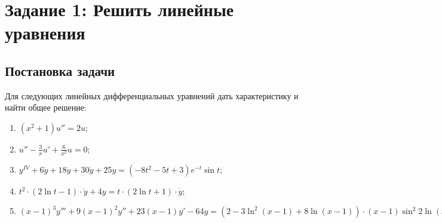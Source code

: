 \section{Задание 1: Решить линейные уравнения}
    \subsection{Постановка задачи}
        Для следующих линейных дифференциальных уравнений дать характеристику и найти общее решение:

        \begin{enumerate}
            \item \( \left( x^2 + 1 \right) u'' = 2u; \)
            \item \( u'' - \frac{3}{x}u' + \frac{6}{x^2}u = 0; \)
            \item \( y^{IV} + 6 \dddot{y} + 18 \ddot{y} + 30 \dot{y} + 25 y = \left( -8t^2 - 5t + 3 \right) e^{-t} \sin{t}; \)
            \item \( t^2 \cdot \left( 2 \ln{t} - 1 \right) \cdot \ddot{y} + 4y = t \cdot \left( 2\ln{t} + 1 \right) \cdot \dot{y}; \)
            \item \( (x-1)^3 y''' + 9 (x-1)^2 y'' + 23(x-1)y' - 64y = \left( 2 - 3\ln^2(x-1)  + 8\ln(x-1) \right) \cdot (x-1) \sin^2 2\ln(x-1). \)
        \end{enumerate}

    
